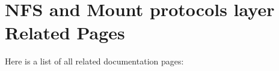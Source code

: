 \section{NFS and Mount protocols layer Related Pages}
Here is a list of all related documentation pages:\begin{CompactList}
\item {}

\end{CompactList}
